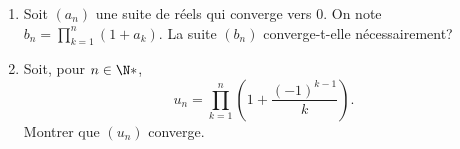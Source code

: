 \begin{enonce}
\begin{exercise}[ID={RMS126 E768},subtitle={Centrale PSI 2015},tags={}, difficulty={0}]
\begin{enumerate}
  \item Soit $(a_n)$ une suite de réels qui converge vers $0$.
    On note $b_n=\prod_{k=1}^{n} \left( 1+a_k \right)$.
    La suite $\left( b_n \right)$ converge-t-elle nécessairement?

  \item Soit, pour $n\in\N*$, 
    \begin{equation*}
      u_n = \prod_{k=1}^n \left( 1 + \frac{(-1)^{k-1}}{k} \right).
    \end{equation*}
    Montrer que $\left( u_n \right)$ converge.
\end{enumerate}
\end{exercise}
\begin{solution}
\end{solution}
\end{enonce}
